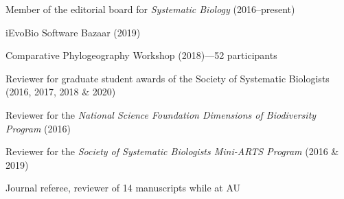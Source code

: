 \begin{veryTightItemize}
    \item Member of the editorial board for \emph{Systematic Biology}
        (2016--present)
    \item iEvoBio Software Bazaar (2019)
    \item Comparative Phylogeography Workshop (2018)---52 participants
    \item Reviewer for graduate student awards of the Society of Systematic
        Biologists (2016, 2017, 2018 \& 2020)
    \item Reviewer for the \emph{National Science Foundation Dimensions of
            Biodiversity Program} (2016)
    \item Reviewer for the \emph{Society of Systematic Biologists Mini-ARTS
            Program} (2016 \& 2019)
    \item Journal referee, reviewer of 14 manuscripts while at AU
\end{veryTightItemize}
